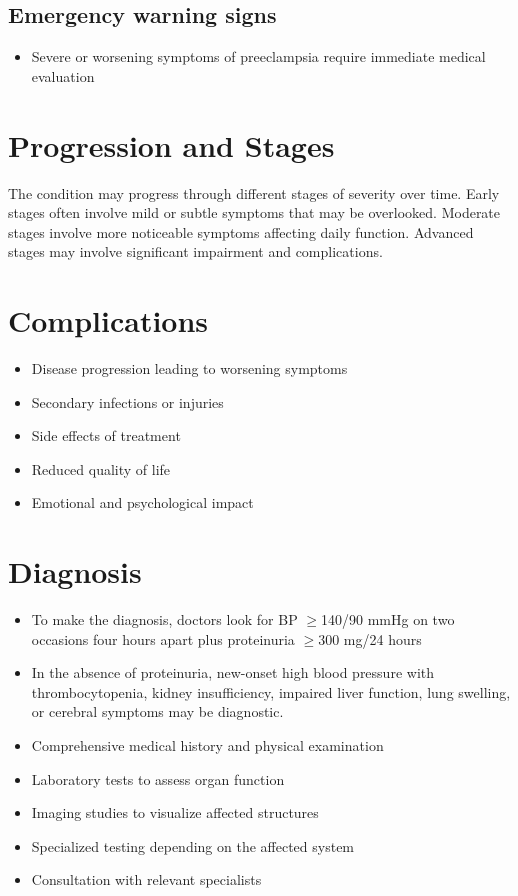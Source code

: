 \subsection{Emergency warning signs}
\begin{itemize}[noitemsep]
  \item Severe or worsening symptoms of preeclampsia require immediate medical evaluation
\end{itemize}
\section{Progression and Stages}
The condition may progress through different stages of severity over time. Early stages often involve mild or subtle symptoms that may be overlooked. Moderate stages involve more noticeable symptoms affecting daily function. Advanced stages may involve significant impairment and complications.
\section{Complications}
\begin{itemize}[noitemsep]
  \item Disease progression leading to worsening symptoms
  \item Secondary infections or injuries
  \item Side effects of treatment
  \item Reduced quality of life
  \item Emotional and psychological impact
\end{itemize}
\section{Diagnosis}
\begin{itemize}[noitemsep]
  \item To make the diagnosis, doctors look for BP $\ge$140/90 mmHg on two occasions four hours apart plus proteinuria $\ge$300 mg/24 hours
  \item In the absence of proteinuria, new-onset high blood pressure with thrombocytopenia, kidney insufficiency, impaired liver function, lung swelling, or cerebral symptoms may be diagnostic.
  \item Comprehensive medical history and physical examination
  \item Laboratory tests to assess organ function
  \item Imaging studies to visualize affected structures
  \item Specialized testing depending on the affected system
  \item Consultation with relevant specialists
\end{itemize}
